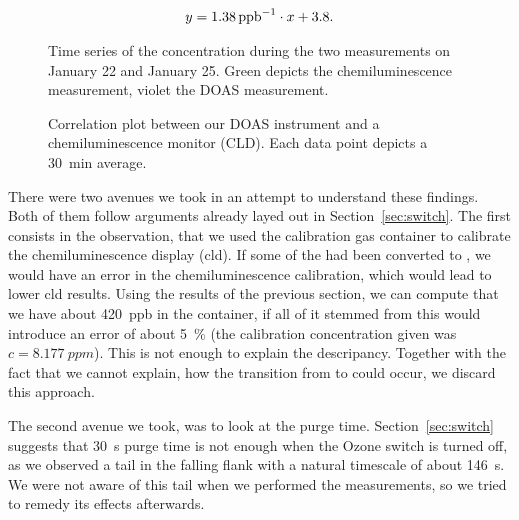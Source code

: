 \begin{align*}
  y = \SI{1.38}{{ppb}\tothe{-1}} \cdot x + 3.8.
\end{align*}

\begin{figure}[htbp]
  \centering
  
  \hfill
  
  \caption{Time series of the  concentration during the two
    measurements on January 22 and January 25. Green depicts the
    chemiluminescence measurement, violet the DOAS measurement.}
  \label{fig:corr-ts}
\end{figure}

\begin{figure}[htbp]
  \centering
  
  \caption{Correlation plot between our DOAS instrument and a
    chemiluminescence monitor (CLD). Each data point depicts a
    \SI{30}{\minute} average.}
  \label{fig:cld-corr}
\end{figure}

There were two avenues we took in an attempt to understand these
findings. Both of them follow arguments already layed out in
Section~\ref{sec:switch}. The first consists in the observation, that
we used the  calibration gas container to calibrate the
chemiluminescence display (cld). If some of the  had been converted
to , we would have an error in the chemiluminescence
calibration, which would lead to lower cld results. Using the results
of the previous section, we can compute that we have about \SI{420}{ppb}
 in the container, if all of it stemmed from  this
would introduce an error of about \SI{5}{\percent} (the calibration
concentration given was $c = \SI{8.177}{ppm}$). This is not enough to
explain the descripancy. Together with the fact that we cannot
explain, how the transition from  to  could occur, we
discard this approach.

The second avenue we took, was to look at the purge
time. Section~\ref{sec:switch} suggests that \SI{30}{\second} purge
time is not enough when the Ozone switch is turned off, as we observed
a tail in the falling flank with a natural timescale of about
\SI{146}{\second}. We were not aware of this tail when we performed
the measurements, so we tried to remedy its effects afterwards. 


